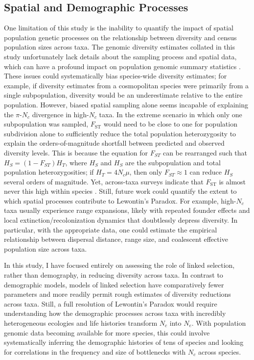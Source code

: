 \documentclass[11pt]{article}
\begin{document}
\subsection*{Spatial and Demographic Processes}

One limitation of this study is the inability to quantify the impact of spatial
population genetic processes on the relationship between diversity and census
population sizes across taxa. The genomic diversity estimates collated in this
study unfortunately lack details about the sampling process and spatial data,
which can have a profound impact on population genomic summary statistics
\parencite{Battey2020-lc}. These issues could systematically bias species-wide
diversity estimates; for example, if diversity estimates from a cosmopolitan
species were primarily from a single subpopulation, diversity would be an
underestimate relative to the entire population. However, biased spatial
sampling alone seems incapable of explaining the $\pi$-$N_c$ divergence in
high-$N_c$ taxa. In the extreme scenario in which only one subpopulation was
sampled, $F_\text{ST}$ would need to be close to one for population subdivision
alone to sufficiently reduce the total population heterozygosity to explain the
orders-of-magnitude shortfall between predicted and observed diversity levels.
This is because the equation for $F_{ST}$ can be rearranged such that $H_S =
(1-F_{ST})H_T$, where $H_S$ and $H_S$ are the subpopulation and total
population heterozygosities; if $H_T = 4N_c\mu$, then only $F_{ST} \approx 1$
can reduce $H_S$ several orders of magnitude. Yet, across-taxa surveys indicate
that $F_\text{ST}$ is almost never this high within species
\parencite{Roux2016-lm}.  Still, future work could quantify the extent to which
spatial processes contribute to Lewontin's Paradox. For example, high-$N_c$
taxa usually experience range expansions, likely with repeated founder effects
and local extinction/recolonization dynamics that doubtlessly depress
diversity. In particular, with the appropriate data, one could estimate the
empirical relationship between dispersal distance, range size, and coalescent
effective population size across taxa.

In this study, I have focused entirely on assessing the role of linked
selection, rather than demography, in reducing diversity across taxa. In
contrast to demographic models, models of linked selection have comparatively
fewer parameters and more readily permit rough estimates of diversity
reductions across taxa. Still, a full resolution of Lewontin's Paradox would
require understanding how the demographic processes across taxa with incredibly
heterogeneous ecologies and life histories transform $N_c$ into $N_e$. With
population genomic data becoming available for more species, this could involve
systematically inferring the demographic histories of tens of species and
looking for correlations in the frequency and size of bottlenecks with $N_c$
across species.
\end{document}
